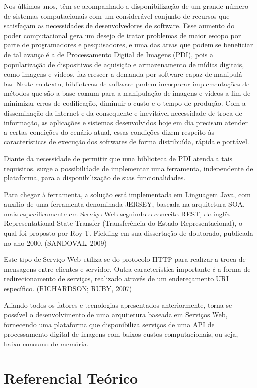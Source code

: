 \documentclass[12pt]{article}
\begin{document}
Nos últimos anos, têm-se acompanhado a disponibilização de um grande número de sistemas 
computacionais com um considerável conjunto de recursos que satisfaçam as necessidades de 
desenvolvedores de software. Esse aumento do poder computacional gera um desejo de tratar 
problemas de maior escopo por parte de programadores e pesquisadores, e uma das áreas que podem 
se beneficiar de tal avanço é a de Processamento Digital de Imagens (PDI), pois a popularização 
de dispositivos de aquisição e armazenamento de mídias digitais, como imagens e vídeos, faz 
crescer a demanda por software capaz de manipulá-las. Neste contexto, bibliotecas de software 
podem incorporar implementações de métodos que são a base comum para a manipulação de imagens e 
vídeos a fim de minimizar erros de codificação, diminuir o custo e o tempo de produção. 
Com a disseminação da internet e da consequente e inevitável necessidade de troca de informação, 
as aplicações e sistemas desenvolvidos hoje em dia precisam 
atender a certas condições do cenário atual, essas condições dizem respeito às características 
de execução dos softwares de forma distribuída, rápida e portável. 

Diante da necessidade de permitir que uma biblioteca de PDI atenda a tais requisitos, surge a
possibilidade de implementar uma ferramenta, independente de plataforma, para a
disponibilização de suas funcionalidades.

Para chegar à ferramenta, a solução está implementada em Linguagem
Java, com auxílio de uma ferramenta denominada JERSEY, baseada na arquitetura
SOA, mais especificamente em Serviço Web seguindo o conceito REST, do inglês
Representational State Transfer (Transferência do Estado Representacional), o qual
foi proposto por Roy T. Fielding em sua dissertação de doutorado, publicada no ano
2000. (SANDOVAL, 2009)

Este tipo de Serviço Web utiliza-se do protocolo HTTP para realizar a troca
de mensagens entre clientes e servidor. Outra característica importante é a forma de
redirecionamento de serviços, realizado através de um endereçamento URI
específico. (RICHARDSON; RUBY, 2007)

Aliando todos os fatores e tecnologias apresentados anteriormente, torna-se
possível o desenvolvimento de uma arquitetura baseada em Serviços Web,
fornecendo uma plataforma que disponibiliza serviços de uma API de processamento digital de imagens
com baixos custos computacionais, ou seja, baixo consumo de memória.

\section{Referencial Teórico} \label{sec:firstpage}
\end{document}
